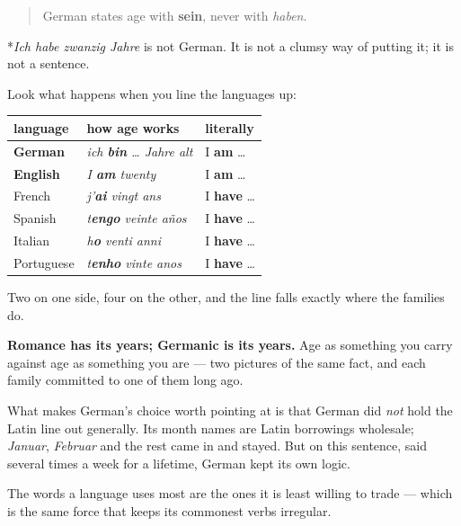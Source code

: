 \begin{grammarlens}[title={Grammar Lens: you ARE your years}]
\begin{quote}
German states age with \textbf{sein}, never with \emph{haben}.
\end{quote}

*\emph{Ich habe zwanzig Jahre} is not German. It is not a clumsy way of putting it; it is not a sentence.

Look what happens when you line the languages up:

\noindent
\begin{tabularx}{\linewidth}{@{}>{\raggedright\arraybackslash}X>{\raggedright\arraybackslash}X>{\raggedright\arraybackslash}X@{}}
\toprule
\textbf{language} & \textbf{how age works} & \textbf{literally} \\
\midrule
\textbf{German} & \emph{ich \textbf{bin} … Jahre alt} & I \textbf{am} … \\
\textbf{English} & \emph{I \textbf{am} twenty} & I \textbf{am} … \\
French & \emph{j'\textbf{ai} vingt ans} & I \textbf{have} … \\
Spanish & \emph{t\textbf{engo} veinte años} & I \textbf{have} … \\
Italian & \emph{h\textbf{o} venti anni} & I \textbf{have} … \\
Portuguese & \emph{t\textbf{enho} vinte anos} & I \textbf{have} … \\
\bottomrule
\end{tabularx}

Two on one side, four on the other, and the line falls exactly where the families do.
\end{grammarlens}

\begin{culture}
\textbf{Romance has its years; Germanic is its years.} Age as something you carry against age as something you are — two pictures of the same fact, and each family committed to one of them long ago.

What makes German's choice worth pointing at is that German did \emph{not} hold the Latin line out generally. Its month names are Latin borrowings wholesale; \emph{Januar}, \emph{Februar} and the rest came in and stayed. But on this sentence, said several times a week for a lifetime, German kept its own logic.

The words a language uses most are the ones it is least willing to trade — which is the same force that keeps its commonest verbs irregular.
\end{culture}


